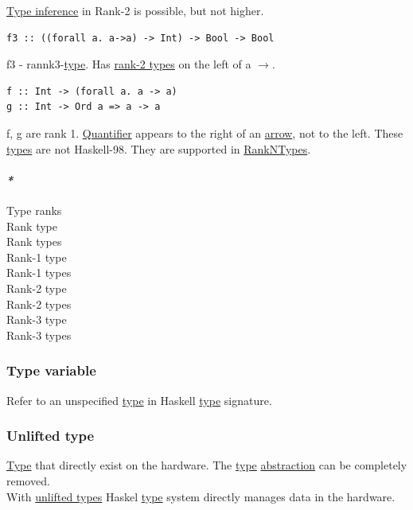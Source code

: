 \documentclass[11pt]{article}
\begin{document}
\hyperref[orgf93c945]{Type inference} in Rank-2 is possible, but not higher.\\

\begin{verbatim}
f3 :: ((forall a. a->a) -> Int) -> Bool -> Bool
\end{verbatim}
f3 - rannk3-\hyperref[orgc4aea2f]{type}. Has \hyperref[org626d943]{rank-2 types} on the left of a \(\to\).\\

\begin{verbatim}
f :: Int -> (forall a. a -> a)
g :: Int -> Ord a => a -> a
\end{verbatim}
f, g are rank 1. \hyperref[org357bc41]{Quantifier} appears to the right of an \hyperref[org03967f4]{arrow}, not to the left. These \hyperref[org4209edd]{types} are not Haskell-98. They are supported in \hyperref[orga7c1c21]{RankNTypes}.\\


\paragraph{\emph{*}}
\label{sec:org036f22c}

\label{org8b33518}Type ranks\\
\label{org3e9572b}Rank type\\
\label{orgb316bb7}Rank types\\
\label{org58dd994}Rank-1 type\\
\label{org49e3bd9}Rank-1 types\\
\label{org9189447}Rank-2 type\\
\label{org626d943}Rank-2 types\\
\label{orgcbd8be9}Rank-3 type\\
\label{orged9a641}Rank-3 types\\

\subsubsection{\label{org036d150}Type variable}
\label{sec:org03dc49c}
Refer to an unspecified \hyperref[orgc4aea2f]{type} in Haskell \hyperref[orgc4aea2f]{type} signature.\\

\subsubsection{\label{org7c8bb44}Unlifted type}
\label{sec:orgd40f8ea}
\hyperref[orgc4aea2f]{Type} that directly exist on the hardware. The \hyperref[orgc4aea2f]{type} \hyperref[org3470ee4]{abstraction} can be completely removed.\\
With \hyperref[orgac3b10a]{unlifted types} Haskel \hyperref[orgc4aea2f]{type} system directly manages data in the hardware.\\
\end{document}
